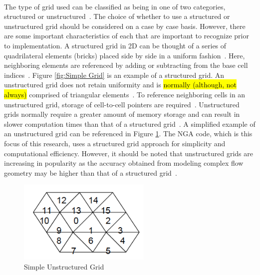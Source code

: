 \paragraph{} The type of grid used can be classified as being in one of two categories, structured or unstructured~\cite{anderson}. The choice of whether to use a structured or unstructured grid should be considered on a case by case basis. However, there are some important characteristics of each that are important to recognize prior to implementation. A structured grid in 2D can be thought of a series of quadrilateral elements (bricks) placed side by side in a uniform fashion~\cite{MIT}. Here, neighboring elements are referenced by adding or subtracting from the base cell indices~\cite{anderson}. Figure \ref{fig:Simple Grid} is an example of a structured grid. An unstructured grid does not retain uniformity and is \hl{normally (although, not always)} comprised of triangular elements~\cite{tu}. To reference neighboring cells in an unstructured grid, storage of cell-to-cell pointers are required~\cite{MIT}. Unstructured grids normally require a greater amount of memory storage and can result in slower computation times than that of a structured grid~\cite{magoules}. A simplified example of an unstructured grid can be referenced in Figure \ref{fig:Unstructured Grid}. The NGA code, which is this focus of this research, uses a structured grid approach for simplicity and computational efficiency. However, it should be noted that unstructured grids are increasing in popularity as the accuracy obtained from modeling complex flow geometry may be higher than that of a structured grid~\cite{Hirt1981}. 

\begin{figure}[htbp]
	\centering
	\includegraphics[width=2.5in]{figs/unstruc}
	\caption{Simple Unstructured Grid \cite{MIT}}
	\label{fig:Unstructured Grid}
\end{figure}

